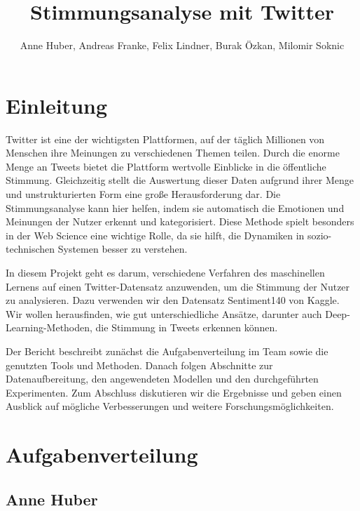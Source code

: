 \documentclass[researchlab,group,]{AIGpaper}
\author{Anne Huber, Andreas Franke, Felix Lindner, Burak Özkan, Milomir Soknic}
\title{Stimmungsanalyse mit Twitter}
\begin{document}
\maketitle %


\newpage
\section{Einleitung}
Twitter ist eine der wichtigsten Plattformen, auf der täglich Millionen von Menschen ihre Meinungen zu verschiedenen Themen teilen. Durch die enorme Menge an Tweets bietet die Plattform wertvolle Einblicke in die öffentliche Stimmung. Gleichzeitig stellt die Auswertung dieser Daten aufgrund ihrer Menge und unstrukturierten Form eine große Herausforderung dar. Die Stimmungsanalyse kann hier helfen, indem sie automatisch die Emotionen und Meinungen der Nutzer erkennt und kategorisiert. Diese Methode spielt besonders in der Web Science eine wichtige Rolle, da sie hilft, die Dynamiken in sozio-technischen Systemen besser zu verstehen.

In diesem Projekt geht es darum, verschiedene Verfahren des maschinellen Lernens auf einen Twitter-Datensatz anzuwenden, um die Stimmung der Nutzer zu analysieren. Dazu verwenden wir den Datensatz \glqq Sentiment140\grqq{} von Kaggle. Wir wollen herausfinden, wie gut unterschiedliche Ansätze, darunter auch Deep-Learning-Methoden, die Stimmung in Tweets erkennen können.

Der Bericht beschreibt zunächst die Aufgabenverteilung im Team sowie die genutzten Tools und Methoden. Danach folgen Abschnitte zur Datenaufbereitung, den angewendeten Modellen und den durchgeführten Experimenten. Zum Abschluss diskutieren wir die Ergebnisse und geben einen Ausblick auf mögliche Verbesserungen und weitere Forschungsmöglichkeiten.

\section{Aufgabenverteilung}

\subsection{Anne Huber}
\end{document}
